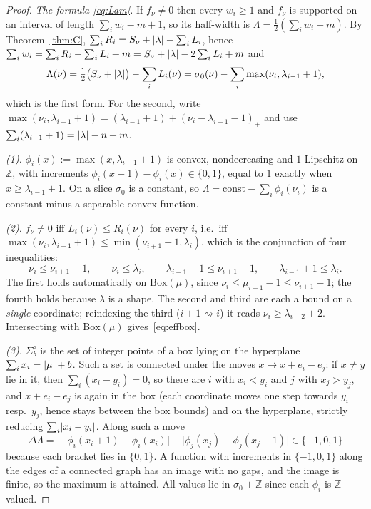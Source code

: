 \documentclass[11pt]{article}
\theoremstyle{definition}
\newcommand{\Z}{\mathbb Z}
\newcommand{\Bx}{\mathrm{Box}}
\DeclarePairedDelimiter{\abs}{\lvert}{\rvert}
\begin{document}
\begin{proof}
\emph{The formula \eqref{eq:Lam}.} If $f_\nu\ne0$ then every $w_i\ge1$ and $f_\nu$ is
supported on an interval of length $\sum_iw_i-m+1$, so its half-width is
$\Lambda=\tfrac12(\sum_iw_i-m)$. By Theorem~\ref{thm:C},
$\sum_iR_i=S_\nu+\abs{\lambda}-\sum_iL_i$, hence
$\sum_iw_i=\sum_iR_i-\sum_iL_i+m=S_\nu+\abs{\lambda}-2\sum_iL_i+m$ and
\[
  \Lambda(\nu)=\tfrac12\bigl(S_\nu+\abs{\lambda}\bigr)-\sum_iL_i(\nu)
  =\sigma_0(\nu)-\sum_i\max(\nu_i,\lambda_{i-1}+1),
\]
which is the first form. For the second, write
$\max(\nu_i,\lambda_{i-1}+1)=(\lambda_{i-1}+1)+(\nu_i-\lambda_{i-1}-1)_+$ and use
$\sum_i(\lambda_{i-1}+1)=\abs{\lambda}-n+m$.

\emph{(1).} $\phi_i(x):=\max(x,\lambda_{i-1}+1)$ is convex, nondecreasing and $1$-Lipschitz
on $\Z$, with increments $\phi_i(x+1)-\phi_i(x)\in\{0,1\}$, equal to $1$ exactly when
$x\ge\lambda_{i-1}+1$. On a slice $\sigma_0$ is a constant, so
$\Lambda=\text{const}-\sum_i\phi_i(\nu_i)$ is a constant minus a separable convex function.

\emph{(2).} $f_\nu\ne0$ iff $L_i(\nu)\le R_i(\nu)$ for every $i$, i.e.\ iff
$\max(\nu_i,\lambda_{i-1}+1)\le\min(\nu_{i+1}-1,\lambda_i)$, which is the conjunction of
four inequalities:
\[
  \nu_i\le\nu_{i+1}-1,\qquad \nu_i\le\lambda_i,\qquad
  \lambda_{i-1}+1\le\nu_{i+1}-1,\qquad \lambda_{i-1}+1\le\lambda_i .
\]
The first holds automatically on $\Bx(\mu)$, since $\nu_i\le\mu_{i+1}-1\le\nu_{i+1}-1$; the
fourth holds because $\lambda$ is a shape. The second and third are each a bound on a
\emph{single} coordinate; reindexing the third ($i+1\rightsquigarrow i$) it reads
$\nu_i\ge\lambda_{i-2}+2$. Intersecting with $\Bx(\mu)$ gives~\eqref{eq:effbox}.

\emph{(3).} $\Sigma^\circ_b$ is the set of integer points of a box lying on the hyperplane
$\sum_i x_i=\abs{\mu}+b$. Such a set is connected under the moves $x\mapsto x+e_i-e_j$: if
$x\ne y$ lie in it, then $\sum_i(x_i-y_i)=0$, so there are $i$ with $x_i<y_i$ and $j$ with
$x_j>y_j$, and $x+e_i-e_j$ is again in the box (each coordinate moves one step towards
$y_i$ resp.\ $y_j$, hence stays between the box bounds) and on the hyperplane, strictly
reducing $\sum_i\abs{x_i-y_i}$. Along such a move
\[
  \Delta\Lambda=-\bigl[\phi_i(x_i+1)-\phi_i(x_i)\bigr]+\bigl[\phi_j(x_j)-\phi_j(x_j-1)\bigr]
  \in\{-1,0,1\}
\]
because each bracket lies in $\{0,1\}$. A function with increments in $\{-1,0,1\}$ along the
edges of a connected graph has an image with no gaps, and the image is finite, so the
maximum is attained. All values lie in $\sigma_0+\Z$ since each $\phi_i$ is $\Z$-valued.
\end{proof}
\end{document}
